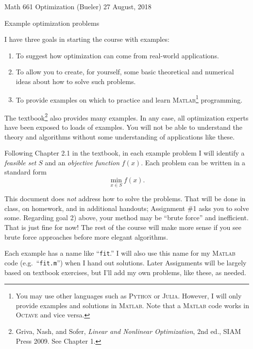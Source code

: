 \documentclass[11pt]{amsart}
\newcommand{\Julia}{\textsc{Julia}\xspace}
\newcommand{\Matlab}{\textsc{Matlab}\xspace}
\newcommand{\Octave}{\textsc{Octave}\xspace}
\newcommand{\Python}{\textsc{Python}\xspace}
\begin{document}
\scriptsize \noindent Math 661 Optimization (Bueler) \hfill 27 August, 2018
\normalsize

\medskip\bigskip
\Large
\centerline{Example optimization problems}

\bigskip\medskip
\normalsize

\thispagestyle{empty}

I have three goals in starting the course with examples:
\renewcommand{\labelenumi}{\arabic{enumi})}
\begin{enumerate}
\item To suggest how optimization can come from real-world applications.
\item To allow you to create, for yourself, some basic theoretical and numerical ideas about how to solve such problems.
\item To provide examples on which to practice and learn \Matlab\footnote{You may use other languages such as \Python or \Julia.  However, I will only provide examples and solutions in \Matlab.  Note that a \Matlab code works in \Octave and vice versa.} programming.
\end{enumerate}

The textbook\footnote{Griva, Nash, and Sofer, \emph{Linear and Nonlinear Optimization}, 2nd ed., SIAM Press 2009.  See Chapter 1.} also provides many examples.  In any case, all optimization experts have been exposed to loads of examples.  You will not be able to understand the theory and algorithms without some understanding of applications like these.

Following Chapter 2.1 in the textbook, in each example problem I will identify a \emph{feasible set} $S$ and an \emph{objective function} $f(x)$.  Each problem can be written in a standard form
    $$\min_{x\in S} f(x).$$

This document does \emph{not} address how to solve the problems.  That will be done in class, on homework, and in additional handouts; Assignment \#1 asks you to solve some.  Regarding goal 2) above, your method may be ``brute force'' and inefficient.  That is just fine for now!  The rest of the course will make more sense if you see brute force approaches before more elegant algorithms.

Each example has a name like ``\texttt{fit}.''  I will also use this name for my \Matlab code (e.g.~``\texttt{fit.m}'') when I hand out solutions.  Later Assignments will be largely based on textbook exercises, but I'll add my own problems, like these, as needed.
\end{document}
